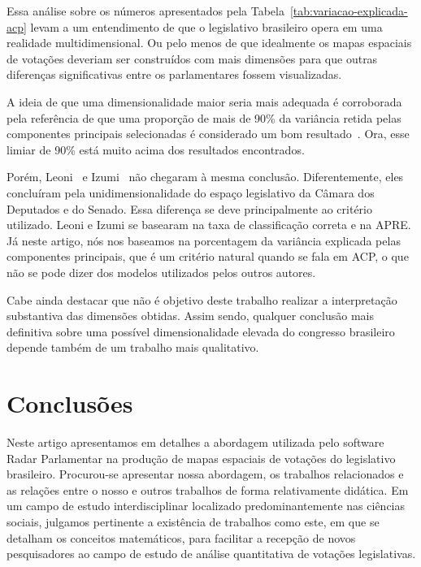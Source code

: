 \documentclass[
	article,			%
	12pt,				%
	oneside,			%
	a4paper,			%
	english,			%
	brazil,				%
	sumario=tradicional,
	oldfontcommands %
	]{abntex2}
\begin{document}
Essa análise sobre os números apresentados pela Tabela~\ref{tab:variacao-explicada-acp} levam a um entendimento de que o legislativo brasileiro opera em uma realidade multidimensional. Ou pelo menos de que idealmente os mapas espaciais de votações deveriam ser construídos com mais dimensões para que outras diferenças significativas entre os parlamentares fossem visualizadas. 

A ideia de que uma dimensionalidade maior seria mais adequada é corroborada pela referência de que uma proporção de mais de 90\% da variância retida pelas componentes principais selecionadas é considerado um bom resultado~\cite{DataMining2003}. Ora, esse limiar de 90\% está muito acima dos resultados encontrados.

Porém, Leoni~\cite{leoni02cdep} e Izumi~\cite{izumi2016senado} não chegaram à mesma conclusão. Diferentemente, eles concluíram pela unidimensionalidade do espaço legislativo da Câmara dos Deputados e do Senado. Essa diferença se deve principalmente ao critério utilizado. Leoni e Izumi se basearam na taxa de classificação correta e na APRE. Já neste artigo, nós nos baseamos na porcentagem da variância explicada pelas componentes principais, que é um critério natural quando se fala em ACP, o que não se pode dizer dos modelos utilizados pelos outros autores.

Cabe ainda destacar que não é objetivo deste trabalho realizar a interpretação substantiva das dimensões obtidas. Assim sendo, qualquer conclusão mais definitiva sobre uma possível dimensionalidade elevada do congresso brasileiro depende também de um trabalho mais qualitativo.

\section{Conclusões}
\label{sec:conclusoes}

Neste artigo apresentamos em detalhes a abordagem utilizada pelo software Radar Parlamentar na produção de mapas espaciais de votações do legislativo brasileiro. Procurou-se apresentar nossa abordagem, os trabalhos relacionados e as relações entre o nosso e outros trabalhos de forma relativamente didática. Em um campo de estudo interdisciplinar localizado predominantemente nas ciências sociais, julgamos pertinente a existência de trabalhos como este, em que se detalham os conceitos matemáticos, para facilitar a recepção de novos pesquisadores ao campo de estudo de análise quantitativa de votações legislativas.
\end{document}
